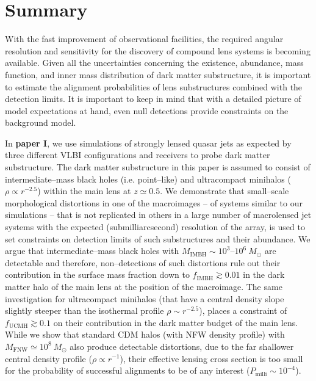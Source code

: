 \documentclass[paper=a4, fontsize=11pt]{scrartcl} %
\numberwithin{equation}{section} %
\numberwithin{figure}{section} %
\numberwithin{table}{section} %
\begin{document}


\newpage
\section{Summary}
With the fast improvement of observational facilities, the required angular resolution and sensitivity for the discovery of compound lens systems is becoming available. Given all the uncertainties concerning the existence, abundance, mass function, and inner mass distribution of dark matter substructure, it is important to estimate the alignment probabilities of lens substructures combined with the detection limits. It is important to keep in mind that with a detailed picture of model expectations at hand, even null detections provide constraints on the background model.

In {\bf paper I}, we use simulations of strongly lensed quasar jets as expected by three different VLBI configurations and receivers to probe dark matter substructure. The dark matter substructure in this paper is assumed to consist of intermediate--mass black holes (i.e. point--like) and ultracompact minihalos ($\rho \propto r^{-2.5}$) within the main lens at $z \simeq 0.5$. We demonstrate that small--scale morphological distortions in one of the macroimages -- of systems similar to our simulations -- that is not replicated in others in a large number of macrolensed jet systems with the expected (submilliarcsecond) resolution of the array, is used to set constraints on detection limits of such substructures and their abundance. We argue that intermediate--mass black holes with $M_\mathrm{IMBH} \sim 10^3$--$10^6\ M_\odot$ are detectable and therefore, non--detections of such distortions rule out their contribution in the surface mass fraction down to $f_\mathrm{IMBH}\gtrsim 0.01$ in the dark matter halo of the main lens at the position of the macroimage. The same investigation for ultracompact minihalos (that have a central density slope slightly steeper than the isothermal profile $\rho\sim r^{-2.5}$), places a constraint of $f_\mathrm{UCMH}\gtrsim 0.1$ on their contribution in the dark matter budget of the main lens. While we show that standard CDM halos (with NFW density profile) with $M_\mathrm{FNW} \simeq 10^8\ M_\odot$ also produce detectable distortions, due to the far shallower central density profile ($\rho \propto r^{-1}$), their effective lensing cross section is too small for the probability of successful alignments to be of any interest ($P_\mathrm{milli}\sim 10^{-4}$).
\end{document}
